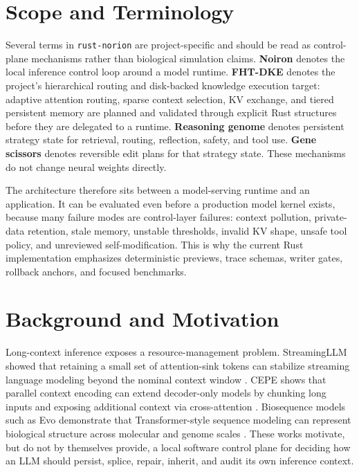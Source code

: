 \documentclass[10pt]{article}
\begin{document}
\section{Scope and Terminology}

Several terms in \texttt{rust-norion} are project-specific and should be read
as control-plane mechanisms rather than biological simulation claims.
\textbf{Noiron} denotes the local inference control loop around a model
runtime. \textbf{FHT-DKE} denotes the project's hierarchical routing and
disk-backed knowledge execution target: adaptive attention routing, sparse
context selection, KV exchange, and tiered persistent memory are planned and
validated through explicit Rust structures before they are delegated to a
runtime. \textbf{Reasoning genome} denotes persistent strategy state for
retrieval, routing, reflection, safety, and tool use. \textbf{Gene scissors}
denotes reversible edit plans for that strategy state. These mechanisms do not
change neural weights directly.

The architecture therefore sits between a model-serving runtime and an
application. It can be evaluated even before a production model kernel exists,
because many failure modes are control-layer failures: context pollution,
private-data retention, stale memory, unstable thresholds, invalid KV shape,
unsafe tool policy, and unreviewed self-modification. This is why the current
Rust implementation emphasizes deterministic previews, trace schemas, writer
gates, rollback anchors, and focused benchmarks.

\section{Background and Motivation}

Long-context inference exposes a resource-management problem. StreamingLLM
showed that retaining a small set of attention-sink tokens can stabilize
streaming language modeling beyond the nominal context window
\cite{streamingllm}. CEPE shows that parallel context encoding can extend
decoder-only models by chunking long inputs and exposing additional context via
cross-attention \cite{cepe}. Biosequence models such as Evo demonstrate that
Transformer-style sequence modeling can represent biological structure across
molecular and genome scales \cite{evo}. These works motivate, but do not by
themselves provide, a local software control plane for deciding how an LLM
should persist, splice, repair, inherit, and audit its own inference context.
\end{document}
